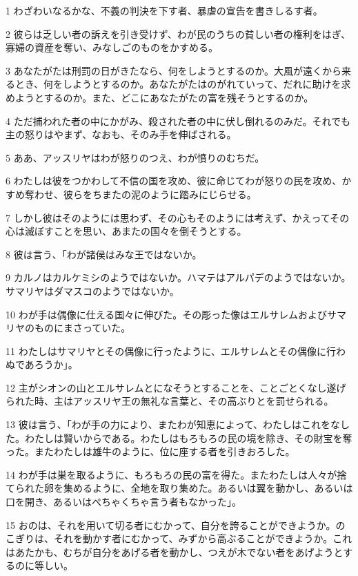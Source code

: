 \par 1 わざわいなるかな、不義の判決を下す者、暴虐の宣告を書きしるす者。
\par 2 彼らは乏しい者の訴えを引き受けず、わが民のうちの貧しい者の権利をはぎ、寡婦の資産を奪い、みなしごのものをかすめる。
\par 3 あなたがたは刑罰の日がきたなら、何をしようとするのか。大風が遠くから来るとき、何をしようとするのか。あなたがたはのがれていって、だれに助けを求めようとするのか。また、どこにあなたがたの富を残そうとするのか。
\par 4 ただ捕われた者の中にかがみ、殺された者の中に伏し倒れるのみだ。それでも主の怒りはやまず、なおも、そのみ手を伸ばされる。
\par 5 ああ、アッスリヤはわが怒りのつえ、わが憤りのむちだ。
\par 6 わたしは彼をつかわして不信の国を攻め、彼に命じてわが怒りの民を攻め、かすめ奪わせ、彼らをちまたの泥のように踏みにじらせる。
\par 7 しかし彼はそのようには思わず、その心もそのようには考えず、かえってその心は滅ぼすことを思い、あまたの国々を倒そうとする。
\par 8 彼は言う、「わが諸侯はみな王ではないか。
\par 9 カルノはカルケミシのようではないか。ハマテはアルパデのようではないか。サマリヤはダマスコのようではないか。
\par 10 わが手は偶像に仕える国々に伸びた。その彫った像はエルサレムおよびサマリヤのものにまさっていた。
\par 11 わたしはサマリヤとその偶像に行ったように、エルサレムとその偶像に行わぬであろうか」。
\par 12 主がシオンの山とエルサレムとになそうとすることを、ことごとくなし遂げられた時、主はアッスリヤ王の無礼な言葉と、その高ぶりとを罰せられる。
\par 13 彼は言う、「わが手の力により、またわが知恵によって、わたしはこれをなした。わたしは賢いからである。わたしはもろもろの民の境を除き、その財宝を奪った。またわたしは雄牛のように、位に座する者を引きおろした。
\par 14 わが手は巣を取るように、もろもろの民の富を得た。またわたしは人々が捨てられた卵を集めるように、全地を取り集めた。あるいは翼を動かし、あるいは口を開き、あるいはぺちゃくちゃ言う者もなかった」。
\par 15 おのは、それを用いて切る者にむかって、自分を誇ることができようか。のこぎりは、それを動かす者にむかって、みずから高ぶることができようか。これはあたかも、むちが自分をあげる者を動かし、つえが木でない者をあげようとするのに等しい。
